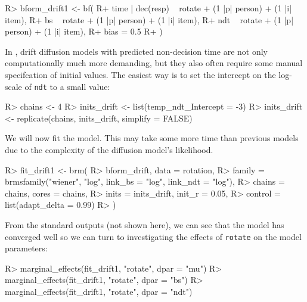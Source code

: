 \documentclass[jss]{jss}
\begin{document}
\begin{CodeChunk}

\begin{CodeInput}
R> bform_drift1 <- bf(
R+   time | dec(resp) ~ rotate + (1 |p| person) + (1 |i| item),
R+   bs ~ rotate + (1 |p| person) + (1 |i| item),
R+   ndt ~ rotate + (1 |p| person) + (1 |i| item),
R+   bias = 0.5
R+ )
\end{CodeInput}
\end{CodeChunk}

In , drift diffusion models with predicted non-decision
time are not only computationally much more demanding, but they also
often require some manual specifcation of initial values. The easiest
way is to set the intercept on the log-scale of \texttt{ndt} to a small
value:

\begin{CodeChunk}

\begin{CodeInput}
R> chains <- 4
R> inits_drift <- list(temp_ndt_Intercept = -3)
R> inits_drift <- replicate(chains, inits_drift, simplify = FALSE)
\end{CodeInput}
\end{CodeChunk}

We will now fit the model. This may take some more time than previous
models due to the complexity of the diffusion model's likelihood.

\begin{CodeChunk}

\begin{CodeInput}
R> fit_drift1 <- brm(
R>   bform_drift, data = rotation, 
R>   family = brmsfamily("wiener", "log", link_bs = "log", link_ndt = "log"),
R>   chains = chains, cores = chains,
R>   inits = inits_drift, init_r = 0.05,
R>   control = list(adapt_delta = 0.99)
R> )
\end{CodeInput}
\end{CodeChunk}

From the standard outputs (not shown here), we can see that the model
has converged well so we can turn to investigating the effects of
\texttt{rotate} on the model parameters:

\begin{CodeChunk}

\begin{CodeInput}
R> marginal_effects(fit_drift1, "rotate", dpar = "mu")
R> marginal_effects(fit_drift1, "rotate", dpar = "bs")
R> marginal_effects(fit_drift1, "rotate", dpar = "ndt")
\end{CodeInput}
\end{CodeChunk}
\end{document}
